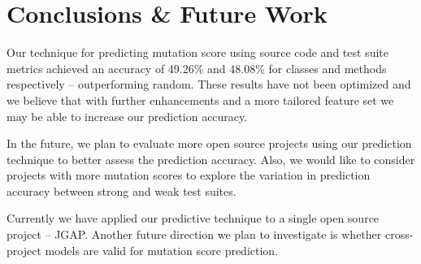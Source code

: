 \documentclass[conference]{IEEEtran}
\begin{document}
\section{Conclusions \& Future Work}
\label{sec:conclusions_future_work}
Our technique for predicting mutation score using source code and test suite metrics achieved an accuracy of 49.26\% and 48.08\% for classes and methods respectively -- outperforming random. These results have not been optimized and we believe that with further enhancements and a more tailored feature set we may be able to increase our prediction accuracy. 

In the future, we plan to evaluate more open source projects using our prediction technique to better assess the prediction accuracy. Also, we would like to consider projects with more mutation scores to explore the variation in prediction accuracy between strong and weak test suites. 

Currently we have applied our predictive technique to a single open source project -- JGAP. Another future direction we plan to investigate is whether cross-project models are valid for mutation score prediction. 




\end{document}
